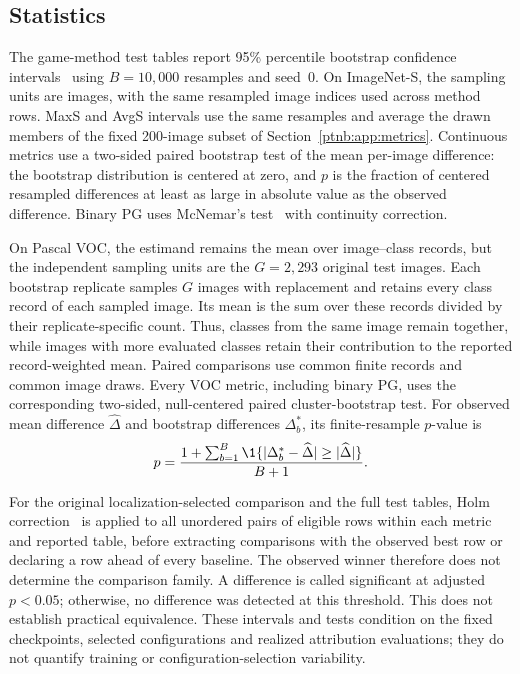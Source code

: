 \subsection{Statistics}\label{ptnb:app:stats}

The game-method test tables report 95\% percentile bootstrap confidence
intervals~\parencite{Efron1993bootstrap} using $B=10{,}000$ resamples and seed~$0$. On ImageNet-S,
the sampling units are images, with the same resampled image indices used across method rows.
MaxS and AvgS intervals use the same resamples and average the drawn members of the fixed 200-image subset of Section~\ref{ptnb:app:metrics}.
Continuous metrics use a two-sided paired bootstrap test of the mean per-image difference: the
bootstrap distribution is centered at zero, and $p$ is the fraction of centered resampled
differences at least as large in absolute value as the observed difference. Binary PG uses
McNemar's test~\parencite{McNemar1947} with continuity correction.

On Pascal VOC, the estimand remains the mean over image--class records, but the independent
sampling units are the $G=2{,}293$ original test images. Each bootstrap replicate samples $G$
images with replacement and retains every class record of each sampled image. Its mean is the sum
over these records divided by their replicate-specific count. Thus, classes from the same image
remain together, while images with more evaluated classes retain their contribution to the
reported record-weighted mean. Paired comparisons use common finite records and common image
draws. Every VOC metric, including binary PG, uses the corresponding two-sided, null-centered
paired cluster-bootstrap test. For observed mean difference $\widehat\Delta$ and bootstrap
differences $\Delta_b^*$, its finite-resample $p$-value is
\begin{align}
    p=\frac{1+\sum_{b=1}^{B}\1\{\lvert\Delta_b^*-\widehat\Delta\rvert
        \geq\lvert\widehat\Delta\rvert\}}{B+1}.
\end{align}

For the original localization-selected comparison and the full test tables, Holm correction~\parencite{Holm1979} is applied to all unordered
pairs of eligible rows within each metric and reported table, before extracting comparisons with
the observed best row or declaring a row ahead of every baseline. The observed winner therefore
does not determine the comparison family. A difference is called significant at adjusted
$p<0.05$; otherwise, no difference was detected at this threshold. This does not establish
practical equivalence. These intervals and tests condition on the fixed checkpoints, selected
configurations and realized attribution evaluations; they do not quantify training or
configuration-selection variability.

